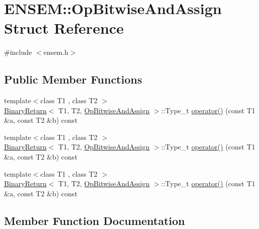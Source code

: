 \hypertarget{structENSEM_1_1OpBitwiseAndAssign}{}\section{E\+N\+S\+EM\+:\+:Op\+Bitwise\+And\+Assign Struct Reference}
\label{structENSEM_1_1OpBitwiseAndAssign}


{\ttfamily \#include $<$ensem.\+h$>$}

\subsection*{Public Member Functions}
\begin{DoxyCompactItemize}
\item 
{\footnotesize template$<$class T1 , class T2 $>$ }\\\mbox{\hyperlink{structENSEM_1_1BinaryReturn}{Binary\+Return}}$<$ T1, T2, \mbox{\hyperlink{structENSEM_1_1OpBitwiseAndAssign}{Op\+Bitwise\+And\+Assign}} $>$\+::Type\+\_\+t \mbox{\hyperlink{structENSEM_1_1OpBitwiseAndAssign_aeae291f2a2bdeac95b1d751d6d94b77d}{operator()}} (const T1 \&a, const T2 \&b) const
\item 
{\footnotesize template$<$class T1 , class T2 $>$ }\\\mbox{\hyperlink{structENSEM_1_1BinaryReturn}{Binary\+Return}}$<$ T1, T2, \mbox{\hyperlink{structENSEM_1_1OpBitwiseAndAssign}{Op\+Bitwise\+And\+Assign}} $>$\+::Type\+\_\+t \mbox{\hyperlink{structENSEM_1_1OpBitwiseAndAssign_aeae291f2a2bdeac95b1d751d6d94b77d}{operator()}} (const T1 \&a, const T2 \&b) const
\item 
{\footnotesize template$<$class T1 , class T2 $>$ }\\\mbox{\hyperlink{structENSEM_1_1BinaryReturn}{Binary\+Return}}$<$ T1, T2, \mbox{\hyperlink{structENSEM_1_1OpBitwiseAndAssign}{Op\+Bitwise\+And\+Assign}} $>$\+::Type\+\_\+t \mbox{\hyperlink{structENSEM_1_1OpBitwiseAndAssign_aeae291f2a2bdeac95b1d751d6d94b77d}{operator()}} (const T1 \&a, const T2 \&b) const
\end{DoxyCompactItemize}


\subsection{Member Function Documentation}
\mbox{\label{structENSEM_1_1OpBitwiseAndAssign_aeae291f2a2bdeac95b1d751d6d94b77d}} 
